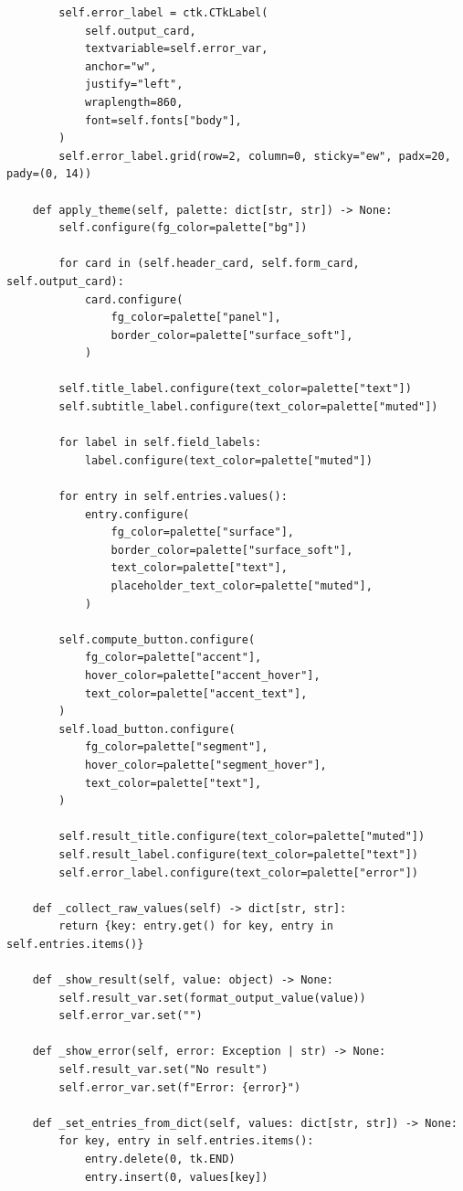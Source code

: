 \documentclass[12pt,a4paper]{article}
\begin{document}
\begin{verbatim}
        self.error_label = ctk.CTkLabel(
            self.output_card,
            textvariable=self.error_var,
            anchor="w",
            justify="left",
            wraplength=860,
            font=self.fonts["body"],
        )
        self.error_label.grid(row=2, column=0, sticky="ew", padx=20, pady=(0, 14))

    def apply_theme(self, palette: dict[str, str]) -> None:
        self.configure(fg_color=palette["bg"])

        for card in (self.header_card, self.form_card, self.output_card):
            card.configure(
                fg_color=palette["panel"],
                border_color=palette["surface_soft"],
            )

        self.title_label.configure(text_color=palette["text"])
        self.subtitle_label.configure(text_color=palette["muted"])

        for label in self.field_labels:
            label.configure(text_color=palette["muted"])

        for entry in self.entries.values():
            entry.configure(
                fg_color=palette["surface"],
                border_color=palette["surface_soft"],
                text_color=palette["text"],
                placeholder_text_color=palette["muted"],
            )

        self.compute_button.configure(
            fg_color=palette["accent"],
            hover_color=palette["accent_hover"],
            text_color=palette["accent_text"],
        )
        self.load_button.configure(
            fg_color=palette["segment"],
            hover_color=palette["segment_hover"],
            text_color=palette["text"],
        )

        self.result_title.configure(text_color=palette["muted"])
        self.result_label.configure(text_color=palette["text"])
        self.error_label.configure(text_color=palette["error"])

    def _collect_raw_values(self) -> dict[str, str]:
        return {key: entry.get() for key, entry in self.entries.items()}

    def _show_result(self, value: object) -> None:
        self.result_var.set(format_output_value(value))
        self.error_var.set("")

    def _show_error(self, error: Exception | str) -> None:
        self.result_var.set("No result")
        self.error_var.set(f"Error: {error}")

    def _set_entries_from_dict(self, values: dict[str, str]) -> None:
        for key, entry in self.entries.items():
            entry.delete(0, tk.END)
            entry.insert(0, values[key])


\end{verbatim}
\end{document}
